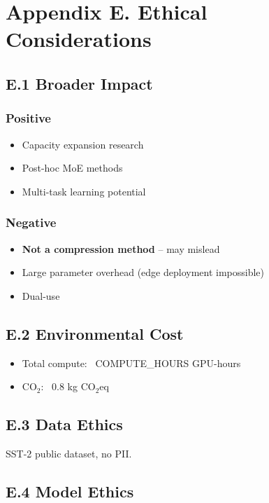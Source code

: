 \section{Appendix E. Ethical Considerations}

\subsection{E.1 Broader Impact}

\subsubsection{Positive}
\begin{itemize}
\item Capacity expansion research
\item Post-hoc MoE methods
\item Multi-task learning potential

\end{itemize}
\subsubsection{Negative}
\begin{itemize}
\item \textbf{Not a compression method} -- may mislead
\item Large parameter overhead (edge deployment impossible)
\item Dual-use

\end{itemize}
\subsection{E.2 Environmental Cost}

\begin{itemize}
\item Total compute: ~{{COMPUTE\_HOURS}} GPU-hours
\item CO$_2$: ~0.8 kg CO$_2$eq

\end{itemize}
\subsection{E.3 Data Ethics}

SST-2 public dataset, no PII.

\subsection{E.4 Model Ethics}

